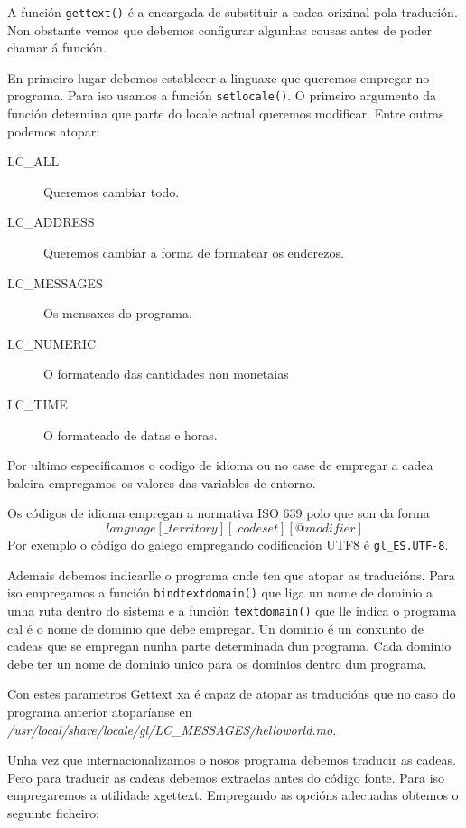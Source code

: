 A función \lstinline{gettext()} é a encargada de substituir a cadea orixinal pola tradución. Non obstante vemos que debemos configurar algunhas cousas antes de poder chamar á función.

En primeiro lugar debemos establecer a linguaxe que queremos empregar no programa. Para iso usamos a función \lstinline{setlocale()}. O primeiro argumento da función determina que parte do locale actual queremos modificar. Entre outras podemos atopar:

\begin{description}
    \item[LC\_ALL] Queremos cambiar todo.
    \item[LC\_ADDRESS] Queremos cambiar a forma de formatear os enderezos.
    \item[LC\_MESSAGES] Os mensaxes do programa.
    \item[LC\_NUMERIC] O formateado das cantidades non monetaias
    \item[LC\_TIME] O formateado de datas e horas.
\end{description}

Por ultimo especificamos o codigo de idioma ou no case de empregar a cadea baleira empregamos os valores das variables de entorno.

Os códigos de idioma empregan a normativa ISO 639 polo que son da forma $$language[\_territory][.codeset][@modifier]$$ Por exemplo o código do galego empregando codificación UTF8 é \lstinline{gl_ES.UTF-8}.

Ademais debemos indicarlle o programa onde ten que atopar as traducións. Para iso empregamos a función \lstinline{bindtextdomain()} que liga un nome de dominio a unha ruta dentro do sistema e a función \lstinline{textdomain()} que lle indica o programa cal é o nome de dominio que debe empregar. Un dominio é un conxunto de cadeas que se empregan nunha parte determinada dun programa. Cada dominio debe ter un nome de dominio unico para os dominios dentro dun programa.

Con estes parametros Gettext xa é capaz de atopar as traducións que no caso do programa anterior atoparíanse en \emph{/usr/local/share/locale/gl/LC\_MESSAGES/helloworld.mo}.

Unha vez que internacionalizamos o nosos programa debemos traducir as cadeas. Pero para traducir as cadeas debemos extraelas antes do código fonte. Para iso empregaremos a utilidade xgettext. Empregando as opcións adecuadas obtemos o seguinte ficheiro:

